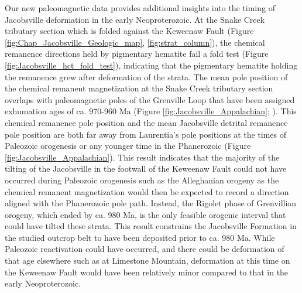 Our new paleomagnetic data provides additional insights into the timing of Jacobsville deformation in the early Neoproterozoic. At the Snake Creek tributary section which is folded against the Keweenaw Fault (Figure \ref{fig:Chap_Jacobsville_Geologic_map}, \ref{fig:strat_column}), the chemical remanence directions held by pigmentary hematite fail a fold test (Figure \ref{fig:Jacobsville_hct_fold_test}), indicating that the pigmentary hematite holding the remanence grew after deformation of the strata. The mean pole position of the chemical remanent magnetization at the Snake Creek tributary section overlaps with paleomagnetic poles of the Grenville Loop that have been assigned exhumation ages of ca. 970-960 Ma (Figure \ref{fig:Jacobsville_Appalachian}; \cite{Brown2012a}). This chemical remanence pole position and the mean Jacobsville detrital remanence pole position are both far away from Laurentia's pole positions at the times of Paleozoic orogenesis or any younger time in the Phanerozoic (Figure \ref{fig:Jacobsville_Appalachian}). This result indicates that the majority of the tilting of the Jacobsville in the footwall of the Keweenaw Fault could not have occurred during Paleozoic orogenesis such as the Alleghanian orogeny as the chemical remanent magnetization would then be expected to record a direction aligned with the Phanerozoic pole path. Instead, the Rigolet phase of Grenvillian orogeny, which ended by ca. 980 Ma, is the only feasible orogenic interval that could have tilted these strata. This result constrains the Jacobsville Formation in the studied outcrop belt to have been deposited prior to ca. 980 Ma. While Paleozoic reactivation could have occurred, and there could be deformation of that age elsewhere such as at Limestone Mountain, deformation at this time on the Keweenaw Fault would have been relatively minor compared to that in the early Neoproterozoic.

